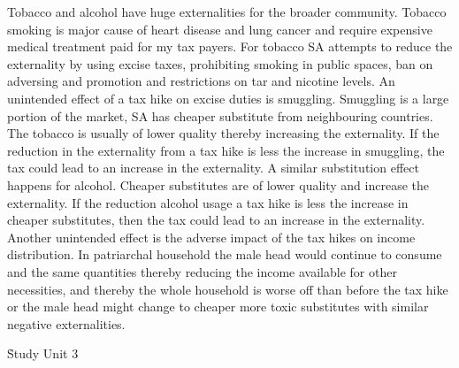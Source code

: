 \documentclass[12pt]{examnotes}
\begin{document}
\ra Tobacco and alcohol have huge externalities for the broader community.
\ra Tobacco smoking is major cause of heart disease and lung cancer and require expensive medical treatment paid for my tax payers.
\ra For tobacco SA attempts to reduce the externality by using excise taxes, prohibiting smoking in public spaces, ban on adversing and promotion and restrictions on tar and nicotine levels.
\ra An unintended effect of a tax hike on excise duties is smuggling.
\ra Smuggling is a large portion of the market, SA has cheaper substitute from neighbouring countries. The tobacco is usually of lower quality thereby increasing the externality.
\ra If the reduction in the externality from a tax hike is less the increase in smuggling, the tax could lead to an increase in the externality.
\ra A similar substitution effect happens for alcohol.
\ra Cheaper substitutes are of lower quality and increase the externality.
\ra  If the reduction alcohol usage a tax hike is less the increase in cheaper substitutes, then the tax could lead to an increase in the externality.
\ra Another unintended effect is the adverse impact of the tax hikes on income distribution.
\ra In patriarchal household the male head would continue to consume and the same quantities thereby reducing the income available for other necessities, and thereby the whole household is worse off than before the tax hike or the male head might change to cheaper more toxic substitutes with similar negative externalities.

\h{Study Unit 3}
\end{document}
